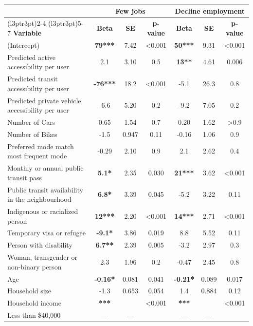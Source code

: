\documentclass[preprint, 3p,
authoryear]{elsarticle} %
\providecommand{\DIFaddbeginFL}{} %
\providecommand{\DIFdelendFL}{} %
\newcommand{\DIFaddincludegraphics}[2][]{{\color{blue}\fbox{\DIFOincludegraphics[#1]{#2}}}} %
\DeclareRobustCommand{\DIFaddbeginFL}{\DIFOaddbeginFL \let\includegraphics\DIFaddincludegraphics} %
\DeclareRobustCommand{\DIFdelendFL}{\DIFOaddendFL \let\includegraphics\DIFOincludegraphics} %
\begin{document}
\begin{table}
\DIFdelendFL \DIFaddbeginFL \begin{tabular}[t]{lcccccc}
\toprule
\multicolumn{1}{c}{ } & \multicolumn{3}{c}{\textbf{Few jobs}} & \multicolumn{3}{c}{\textbf{Decline employment}} \\
\cmidrule(l{3pt}r{3pt}){2-4} \cmidrule(l{3pt}r{3pt}){5-7}
\textbf{Variable} & \textbf{Beta} & \textbf{SE} & \textbf{p-value} & \textbf{Beta} & \textbf{SE} & \textbf{p-value}\\
\midrule
(Intercept) & \textbf{79***} & 7.42 & <0.001 & \textbf{50***} & 9.31 & <0.001\\
Predicted active accessibility per user & 2.1 & 3.10 & 0.5 & \textbf{13**} & 4.61 & 0.006\\
Predicted transit accessibility per user & \textbf{-76***} & 18.2 & <0.001 & -5.1 & 26.3 & 0.8\\
Predicted private vehicle accessibility per user & -6.6 & 5.20 & 0.2 & -9.2 & 7.05 & 0.2\\
Number of Cars & 0.65 & 1.54 & 0.7 & 0.20 & 1.62 & >0.9\\
\addlinespace
Number of Bikes & -1.5 & 0.947 & 0.11 & -0.16 & 1.06 & 0.9\\
Preferred mode match most frequent mode & -0.29 & 2.10 & 0.9 & 2.1 & 2.62 & 0.4\\
Monthly or annual public transit pass & \textbf{5.1*} & 2.35 & 0.030 & \textbf{21***} & 3.62 & <0.001\\
Public transit availability in the neighbourhood & \textbf{6.8*} & 3.39 & 0.045 & -5.2 & 3.22 & 0.11\\
Indigenous or racialized person & \textbf{12***} & 2.20 & <0.001 & \textbf{14***} & 2.71 & <0.001\\
\addlinespace
Temporary visa or refugee & \textbf{-9.1*} & 3.86 & 0.019 & 8.8 & 5.52 & 0.11\\
Person with disability & \textbf{6.7**} & 2.39 & 0.005 & -3.2 & 2.97 & 0.3\\
Woman, transgender or non-binary person & 2.3 & 1.96 & 0.2 & -0.47 & 2.45 & 0.8\\
Age & \textbf{-0.16*} & 0.081 & 0.041 & \textbf{-0.21*} & 0.089 & 0.017\\
Household size & -1.3 & 0.653 & 0.054 & 1.4 & 0.884 & 0.12\\
\addlinespace
Household income & \textbf{***} &  & <0.001 & \textbf{***} &  & <0.001\\
\hspace{1em}Less than \$40,000 & — & — &  & — & — & \\

\end{tabular}
\end{table}
\end{document}
